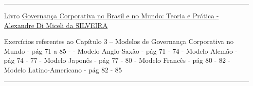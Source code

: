 \documentclass[
]{book}
\begin{document}
\begin{center}\rule{0.5\linewidth}{0.5pt}\end{center}

Livro \href{https://pdfcoffee.com/governana-corporativa-no-brasil-e-no-mundo-pdf-free.html}{Governança Corporativa no Brasil e no Mundo: Teoria e Prática - Alexandre Di Miceli da SILVEIRA}

Exercícios referentes ao Capítulo 3 -- Modelos de Governança Corporativa no Mundo - pág 71 a 85 - - Modelo Anglo-Saxão - pág 71 - 74 - Modelo Alemão - pág 74 - 77 - Modelo Japonês - pág 77 - 80 - Modelo Francês - pág 80 - 82 - Modelo Latino-Americano - pág 82 - 85

\begin{center}\rule{0.5\linewidth}{0.5pt}\end{center}
\end{document}
